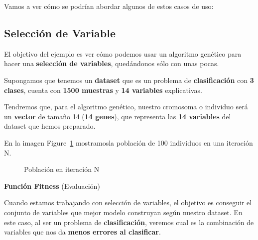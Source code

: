 \documentclass[
  a4paper,
  DIV=11,
  numbers=noendperiod]{scrreprt}
\begin{document}
Vamos a ver cómo se podrían abordar algunos de estos casos de uso:

\subsection{Selección de Variable}\label{selecciuxf3n-de-variable}

El objetivo del ejemplo es ver cómo podemos usar un algoritmo genético
para hacer una \textbf{selección de variables}, quedándonos sólo con
unas pocas.

Supongamos que tenemos un \textbf{dataset} que es un problema de
\textbf{clasificación} con \textbf{3 clases}, cuenta con \textbf{1500
muestras} y \textbf{14 variables} explicativas.

Tendremos que, para el algoritmo genético, nuestro cromosoma o individuo
será un \textbf{vector} de tamaño 14 (\textbf{14 genes}), que representa
las \textbf{14 variables} del dataset que hemos preparado.

En la imagen Figure~\ref{fig-poblacion} mostramosla población de 100
individuos en una iteración N.

\begin{figure}


\caption{\label{fig-poblacion}Población en iteración N}

\end{figure}%

\textbf{Función Fitness} (Evaluación)

Cuando estamos trabajando con selección de variables, el objetivo es
conseguir el conjunto de variables que mejor modelo construyan según
nuestro dataset. En este caso, al ser un problema de
\textbf{clasificación}, veremos cual es la combinación de variables que
nos da \textbf{menos errores al clasificar}.
\end{document}
